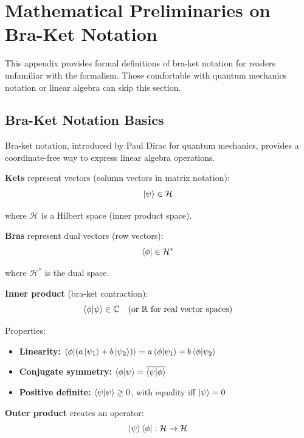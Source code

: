 \documentclass[11pt,a4paper]{article}
\theoremstyle{definition}
\begin{document}
\appendix

\section{Mathematical Preliminaries on Bra-Ket Notation}

This appendix provides formal definitions of bra-ket notation for readers unfamiliar with the formalism. Those comfortable with quantum mechanics notation or linear algebra can skip this section.

\subsection{Bra-Ket Notation Basics}

Bra-ket notation, introduced by Paul Dirac for quantum mechanics, provides a coordinate-free way to express linear algebra operations.

\textbf{Kets} represent vectors (column vectors in matrix notation):
\begin{equation}
\ket{\psi} \in \mathcal{H}
\end{equation}

where $\mathcal{H}$ is a Hilbert space (inner product space).

\textbf{Bras} represent dual vectors (row vectors):
\begin{equation}
\bra{\phi} \in \mathcal{H}^*
\end{equation}

where $\mathcal{H}^*$ is the dual space.

\textbf{Inner product} (bra-ket contraction):
\begin{equation}
\braket{\phi|\psi} \in \mathbb{C} \quad \text{(or } \mathbb{R} \text{ for real vector spaces)}
\end{equation}

Properties:
\begin{itemize}
\item \textbf{Linearity:} $\braket{\phi|(a\ket{\psi_1} + b\ket{\psi_2})} = a\braket{\phi|\psi_1} + b\braket{\phi|\psi_2}$
\item \textbf{Conjugate symmetry:} $\braket{\phi|\psi} = \overline{\braket{\psi|\phi}}$
\item \textbf{Positive definite:} $\braket{\psi|\psi} \geq 0$, with equality iff $\ket{\psi} = 0$
\end{itemize}

\textbf{Outer product} creates an operator:
\begin{equation}
\ket{\psi}\bra{\phi} : \mathcal{H} \to \mathcal{H}
\end{equation}
\end{document}
